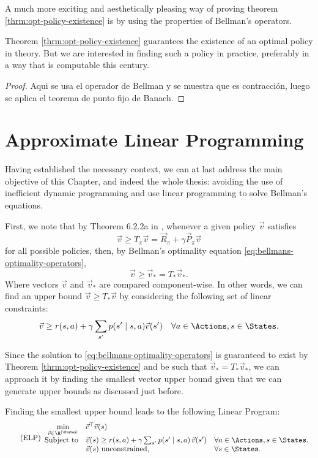 A much more exciting and aesthetically pleasing way of proving theorem \ref{thrm:opt-policy-existence} is by using the properties of Bellman's operators.

Theorem \ref{thrm:opt-policy-existence} guarantees the existence of an optimal
policy in theory. But we are interested in finding such a policy in practice,
preferably in a way that is computable this century. 

\begin{proof}
    Aqui se usa el operador de Bellman y se muestra que es contracción, luego se
    aplica el teorema de punto fijo de Banach.
\end{proof}


\section{Approximate Linear Programming}
Having established the necessary context, we can at last address the main
objective of this Chapter, and indeed the whole thesis: avoiding the use of
inefficient dynamic programming and use linear programming to solve Bellman's
equations.

First, we note that by Theorem 6.2.2a in \cite[Ch.~6.9.1]{puterman2014},
whenever a given policy $\vec{v}$ satisfies
\begin{equation*}
    \vec{v} \geq T_\pi \vec{v} = \vec{R}_\pi + \gamma \vec{P}_{\pi} \vec{v}
\end{equation*}
for all possible policies, then, by Bellman's optimality equation
\eqref{eq:bellmans-optimality-operators},
\begin{equation*}
    \vec{v} \geq \vec{v}_* = T_* \vec{v}_*.
\end{equation*}
Where vectors $\vec{v}$ and $\vec{v}_*$ are compared component-wise. In other words, we can find an upper bound $\vec{v} \geq T_{*} \vec{v}$ by considering the following set of linear constraints:
\begin{equation}
    \vec{v} \geq r(s, a) + \gamma \sum_{s'} p(s' \mid s, a) \vec{v}(s') \quad \forall a \in \Actions, s \in \States.
\end{equation}

Since the solution to \eqref{eq:bellmans-optimality-operators} is guaranteed to
exist by Theorem \ref{thrm:opt-policy-existence} and be such that $\vec{v}_* =
T_* \vec{v}_*$, we can approach it by finding the smallest vector upper bound
given that we can generate upper bounds as discussed just before.

Finding the smallest upper bound leads to the following Linear Program:
\begin{equation}
\label{lp:exact-lp}
\tag{ELP}
\begin{array}{rl@{}ll}
    \displaystyle \min_{\vec{v} \in \R^{|\States|}} & \vec{c}^{\top} \vec{v} (s) \\
    \text{Subject to} & \vec{v} (s) \geq r(s,a) + \gamma \sum_{s'} p(s' \mid s, a) \, \vec{v} (s') & \quad \forall a \in \Actions, s \in \States. \\
    & \vec{v}(s) \text{ unconstrained,} & \quad \forall s \in \States.
\end{array}
\end{equation}


